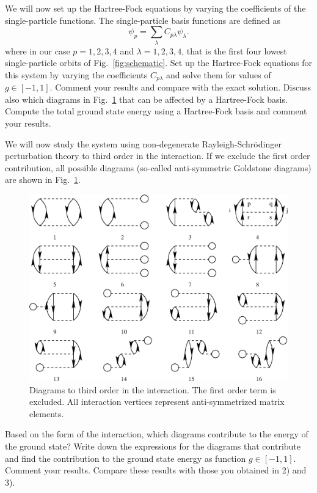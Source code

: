 We will now set up the Hartree-Fock equations by varying the coefficients of the single-particle functions.
The single-particle basis functions are defined as
\[
    \psi_p = \sum_{\lambda} C_{p\lambda} \psi_{\lambda}.
\]
where in our case $p=1,2,3,4$ and $\lambda = 1, 2, 3, 4$, that is the first four lowest single-particle orbits of Fig.~\ref{fig:schematic}.
Set up the Hartree-Fock equations for this system by varying the coefficients $C_{p\lambda}$ and solve them for values of $g \in [-1, 1]$.
Comment your results and compare with the exact solution.
Discuss also which diagrams in Fig.~\ref{fig:diagrams} that can be affected by a Hartree-Fock basis.
Compute the total ground state energy  using a Hartree-Fock basis and comment your results.

We will now study the system using non-degenerate Rayleigh-Schr\"odinger perturbation theory to third order in the interaction.
If we exclude the first order contribution, all possible diagrams (so-called anti-symmetric Goldstone diagrams) are shown in Fig.~\ref{fig:diagrams}.
\begin{figure}[hbtp]
    \centering
    \includegraphics[width=.6\textwidth]{figures/diagrams.eps}
    \caption{
        Diagrams to third order in the interaction.
        The first order
        term is excluded.
        All interaction vertices represent anti-symmetrized matrix elements.\label{fig:diagrams}
    }
\end{figure}

Based on the form of the interaction, which diagrams contribute to the energy of the ground state?  Write down the expressions for the diagrams that contribute and find the contribution to the ground state energy as function $g\in [-1,1]$.
Comment your results.
Compare these results with those you obtained in 2) and 3). %

\subsection{}
